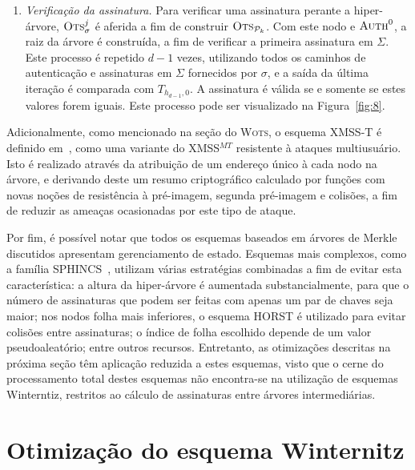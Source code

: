 \documentclass[12pt]{report}
\newcommand{\pk}{\mathcal{P}_k}
\begin{document}
\begin{enumerate}
  \item[] \emph{Verificação da assinatura.} Para verificar uma assinatura perante a hiper-árvore, $\textsc{Ots}_{\sigma}^{j}$ é aferida a fim de construir $\textsc{Ots}_{\pk{}}$. Com este nodo e $\textsc{Auth}^{0}$, a raiz da árvore é construída, a fim de verificar a primeira assinatura em $\Sigma$. Este processo é  repetido $d - 1$ vezes, utilizando todos os caminhos de autenticação e assinaturas em $\Sigma$ fornecidos por $\sigma$, e a saída da última iteração é comparada com $T_{h_{d - 1}, 0}$. A assinatura é válida se e somente se estes valores forem iguais. Este processo pode ser visualizado na Figura~\ref{fig:8}.
    
\end{enumerate}


Adicionalmente, como mencionado na seção do \textsc{Wots}, o esquema XMSS-T é definido em~\cite{Hulsing:2016:MMA:3081852.3081871}, como uma variante do XMSS$^{MT}$ resistente à ataques multiusuário. Isto é realizado através da atribuição de um endereço único à cada nodo na árvore, e derivando deste um resumo criptográfico calculado por funções com novas noções de resistência à pré-imagem, segunda pré-imagem e colisões, a fim de reduzir as ameaças ocasionadas por este tipo de ataque.

Por fim, é possível notar que todos os esquemas baseados em árvores de Merkle discutidos apresentam gerenciamento de estado. Esquemas mais complexos, como a família SPHINCS~\cite{Bernstein2015,sphincsplus}, utilizam várias estratégias combinadas a fim de evitar esta característica: a altura da hiper-árvore é aumentada substancialmente, para que o número de assinaturas que podem ser feitas com apenas um par de chaves seja maior; nos nodos folha mais inferiores, o esquema HORST é utilizado para evitar colisões entre assinaturas; o índice de folha escolhido depende de um valor pseudoaleatório; entre outros recursos. Entretanto, as otimizações descritas na próxima seção têm aplicação reduzida a estes esquemas, visto que o cerne do processamento total destes esquemas não encontra-se na utilização de esquemas Winterntiz, restritos ao cálculo de assinaturas entre árvores intermediárias.

\chapter{Otimização do esquema Winternitz}
\end{document}
